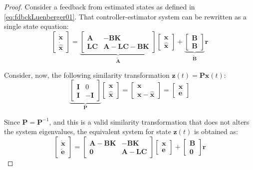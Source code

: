 \documentclass[a4paper,11pt]{book}
\numberwithin{figure}{chapter}
\numberwithin{equation}{chapter}
\numberwithin{table}{chapter}
\theoremstyle{definition}
\begin{document}
\begin{proof}
	Consider a feedback from estimated states as defined in \eqref{eq:fdbckLuenberger01}. That controller-estimator system can be rewritten as a single state equation:
	\begin{equation}
	\begin{bmatrix} \dot{\bm{x}} \\ \dot{\hat{\bm{x}}}	\end{bmatrix}
	=
	\underbrace{\begin{bmatrix}
		\bm{A} & - \bm{B} \bm{K} \\
		\bm{L} \bm{C} & \bm{A} - \bm{L} \bm{C} - \bm{B} \bm{K}
	\end{bmatrix}}_{\tilde{\bm{A}}} \begin{bmatrix} \bm{x} \\ \hat{\bm{x}} \end{bmatrix}
	+
	\underbrace{\begin{bmatrix}	\bm{B} \\ \bm{B} \end{bmatrix}}_{\tilde{\bm{B}}} \bm{r}
\end{equation} 

Consider, now, the following similarity transformation $\bm{z}(t) = \bm{P} \bm{x}(t)$:
\begin{equation}
	\underbrace{\begin{bmatrix}
		\bm{I} & 0 \\ \bm{I} & -\bm{I}
	\end{bmatrix}}_{\bm{P}} \begin{bmatrix}
		\bm{x} \\ \hat{\bm{x}}
	\end{bmatrix} = \begin{bmatrix}
		\bm{x} \\ \bm{x} - \hat{\bm{x}}
	\end{bmatrix} = \begin{bmatrix}
		\bm{x} \\ \bm{e}
	\end{bmatrix} 
\end{equation}

Since $\bm{P} = \bm{P}^{-1}$, and this is a valid similarity transformation that does not alters the system eigenvalues, the equivalent system for state $\bm{z}(t)$ is obtained as:
\begin{equation}
	\begin{bmatrix} \dot{\bm{x}} \\ \dot{\bm{e}}	\end{bmatrix}
	=
	\begin{bmatrix}
		\bm{A} - \bm{B} \bm{K} & - \bm{B} \bm{K} \\
		\bm{0} & \bm{A} - \bm{L} \bm{C}
	\end{bmatrix} \begin{bmatrix} \bm{x} \\ \bm{e} \end{bmatrix}
	+
	\begin{bmatrix}	\bm{B} \\ \bm{0} \end{bmatrix} \bm{r}
\end{equation} \vskip0.2cm


\end{proof}
\end{document}
